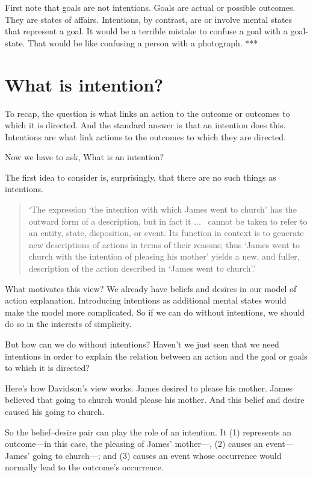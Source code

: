 \documentclass[12pt,\papersize]{extarticle}
\begin{document}
First note that goals are not intentions.
Goals are actual or possible outcomes.
They are states of affairs.
Intentions, by contrast, are or involve mental states that represent a goal.
It would be a terrible mistake to confuse a goal with a goal-state.
That would be like confusing a person with a photograph.
***


\section{What is intention?}
To recap, the question is what links an action to the outcome or outcomes to which it is directed.
And the standard answer is that an intention does this.
Intentions are what link  actions to the outcomes to which they are directed.

Now we have to ask, What is an intention?

The first idea to consider is, surprisingly, that there are no such things as intentions.
%
\begin{quote}
`The expression `the intention with which James went to church' has the outward form of a description, but in fact it
...\ %
 cannot be taken to refer to an entity, state, disposition, or event. Its function in context is to generate new descriptions of actions in terms of their reasons; thus `James went to church with the intention of pleasing his mother' yields a new, and fuller, description of the action described in `James went to church'.' 
\citep[p.\ 690]{davidson:1963_orig}
\end{quote}
%
What motivates this view?
We already have beliefs and desires in our model of action explanation.
Introducing intentions as additional mental states would make the model more complicated.
So if we can do without intentions, we should do so in the interests of simplicity.

But how can we do without intentions?
Haven't we just seen that we need intentions in order to explain the relation between an action and the goal or goals to which it is directed?

Here's how Davidson's view works.
James desired to please his mother.
James believed that going to church would please his mother.
And this belief and desire caused his going to church.

So the belief--desire pair can play the role of an intention.  
It (1) represents an outcome---in this case, the pleasing of James' mother---, (2) causes an event---James' going to church---; and (3) causes an event whose occurrence would normally lead to the outcome’s occurrence.
\end{document}
